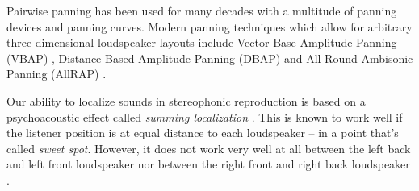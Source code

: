 Pairwise panning has been used for many decades
with a multitude of panning devices and panning curves.
Modern panning techniques
which allow for arbitrary three-dimensional loudspeaker layouts
include
Vector Base Amplitude Panning (VBAP)
\parencite{pulkki1997vbap},
Distance-Based Amplitude Panning (DBAP)
\parencite{lossius2009dbap}
and All-Round Ambisonic Panning (AllRAP)
\parencite{zotter2012allrap}.

Our ability to localize sounds in stereophonic reproduction is
based on a psychoacoustic effect called
\emph{summing localization}
\parencite{theile1980lokalisation}.
This is known to work well
if the listener position is at equal distance to each loudspeaker
-- in a point that's called \emph{sweet spot}.
However, it does not work very well at all between
the left back and left front loudspeaker
nor between the right front and right back loudspeaker
\parencite{theile1977localization}.

